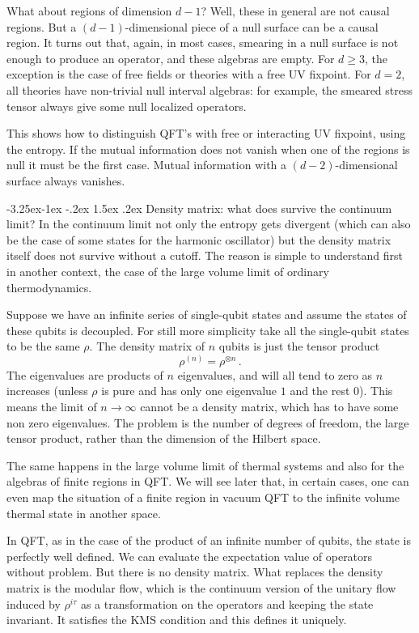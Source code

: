 \documentclass[11pt]{article}
\makeatletter
\renewcommand\subsection{\@startsection{subsection}{2}{\z@}%
                                   {-3.25ex\@plus -1ex \@minus -.2ex}%
                                     {1.5ex \@plus .2ex}%
                                     {\normalfont\bfseries}}
\numberwithin{equation}{section}
\newcommand{\be}{\begin{equation}}
\newcommand{\ee}{\end{equation}}
\makeatother
\begin{document}
What about regions of dimension $d-1$? Well, these in general are not causal regions. But a $(d-1)$-dimensional piece of a null surface can be a causal region. It turns out that, again, in most cases, smearing in a null surface is not enough to produce an operator, and these algebras are empty. For $d\ge 3$, the exception is the case of free fields or theories with a free UV fixpoint. For $d=2$, all theories have non-trivial null interval algebras: for example, the smeared stress tensor always give some null localized operators.  

This shows how to distinguish QFT's with free or interacting UV fixpoint, using the entropy. If the mutual information does not vanish when one of the regions is null it must be the first case. Mutual information with a $(d-2)$-dimensional surface always vanishes. 

\subsection{Density matrix: what does survive the continuum limit?}
\label{density}
In the continuum limit not only the entropy gets divergent (which can also be the case of some states for the harmonic oscillator) but the density matrix itself does not survive without a cutoff. The reason is simple to understand first in another context, the case of the large volume limit of ordinary thermodynamics. 

Suppose we have an infinite series of single-qubit states and assume the states of these qubits is decoupled. For still more simplicity take all the single-qubit states to be the same $\rho$. The density matrix of $n$ qubits is just the tensor product
\be
\rho^{(n)}=\rho^{\otimes n}\,. 
\ee
The eigenvalues are products of $n$ eigenvalues, and will all tend to zero as $n$ increases (unless $\rho$ is pure and has only one eigenvalue $1$ and the rest $0$). This means the limit of $n\rightarrow \infty$ cannot be a density matrix, which has to have some non zero eigenvalues. The problem is the number of degrees of freedom, the large tensor product, rather than the dimension of the Hilbert space. 

The same happens in the large volume limit of thermal systems and also for the algebras of finite regions in QFT. We will see later that, in certain cases, one can even map the situation of a finite region in vacuum QFT to the infinite volume thermal state in another space. 

In QFT, as in the case of the product of an infinite number of qubits, the state is perfectly well defined. We can evaluate the expectation value of operators without problem. But there is no density matrix.     
What replaces the density matrix is the modular flow, which is the continuum version of the unitary flow induced by $\rho^{i\tau}$ as a transformation on the operators and keeping the state invariant. It satisfies the KMS condition and this defines it uniquely.  
\end{document}
